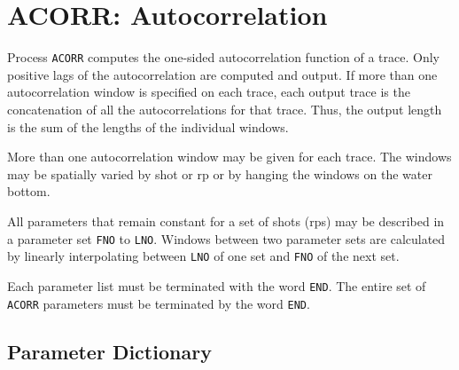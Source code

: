 \section{ACORR: Autocorrelation}
\label{cmd_acorr}

Process \texttt{ACORR} computes the one-sided autocorrelation function of a
trace. Only positive lags of the autocorrelation are computed and output. If
more than one autocorrelation window is specified on each trace, each output
trace is the concatenation of all the autocorrelations for that  trace.
Thus, the output length is the sum of the lengths of the individual windows.

More than one autocorrelation window may be given for each trace. The windows
may be spatially varied by \gls{shot} or \gls{rp} or by hanging the windows on the water
bottom.

All parameters that remain constant for a set of \glspl{shot} (\glspl{rp}) may be described
in a parameter set \texttt{FNO} to \texttt{LNO}. Windows between two parameter
sets are calculated by linearly interpolating between \texttt{LNO} of one set
and \texttt{FNO} of the next set.

Each parameter list must be terminated with the word \texttt{END}. The entire
set of \texttt{ACORR} parameters must be terminated by the word \texttt{END}.

\subsection{Parameter Dictionary}

